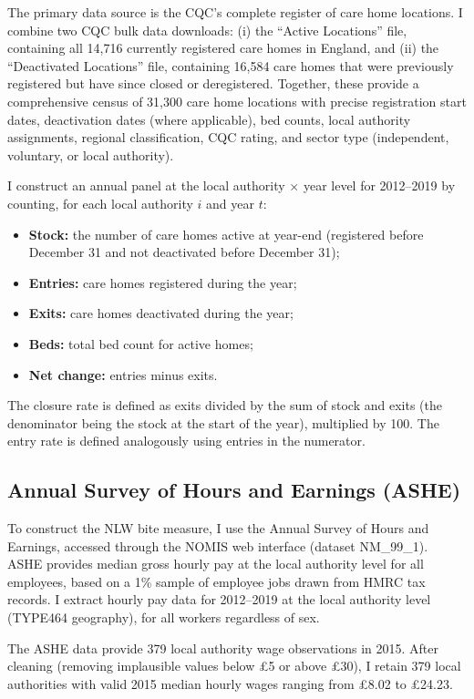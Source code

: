 \documentclass[12pt]{article}
\begin{document}
The primary data source is the CQC's complete register of care home locations. I combine two CQC bulk data downloads: (i) the ``Active Locations'' file, containing all 14,716 currently registered care homes in England, and (ii) the ``Deactivated Locations'' file, containing 16,584 care homes that were previously registered but have since closed or deregistered. Together, these provide a comprehensive census of 31,300 care home locations with precise registration start dates, deactivation dates (where applicable), bed counts, local authority assignments, regional classification, CQC rating, and sector type (independent, voluntary, or local authority).

I construct an annual panel at the local authority $\times$ year level for 2012--2019 by counting, for each local authority $i$ and year $t$:
\begin{itemize}
    \item \textbf{Stock:} the number of care homes active at year-end (registered before December 31 and not deactivated before December 31);
    \item \textbf{Entries:} care homes registered during the year;
    \item \textbf{Exits:} care homes deactivated during the year;
    \item \textbf{Beds:} total bed count for active homes;
    \item \textbf{Net change:} entries minus exits.
\end{itemize}

The closure rate is defined as exits divided by the sum of stock and exits (the denominator being the stock at the start of the year), multiplied by 100. The entry rate is defined analogously using entries in the numerator.

\subsection{Annual Survey of Hours and Earnings (ASHE)}

To construct the NLW bite measure, I use the Annual Survey of Hours and Earnings, accessed through the NOMIS web interface (dataset NM\_99\_1). ASHE provides median gross hourly pay at the local authority level for all employees, based on a 1\% sample of employee jobs drawn from HMRC tax records. I extract hourly pay data for 2012--2019 at the local authority level (TYPE464 geography), for all workers regardless of sex.

The ASHE data provide 379 local authority wage observations in 2015. After cleaning (removing implausible values below \pounds5 or above \pounds30), I retain 379 local authorities with valid 2015 median hourly wages ranging from \pounds8.02 to \pounds24.23.
\end{document}

